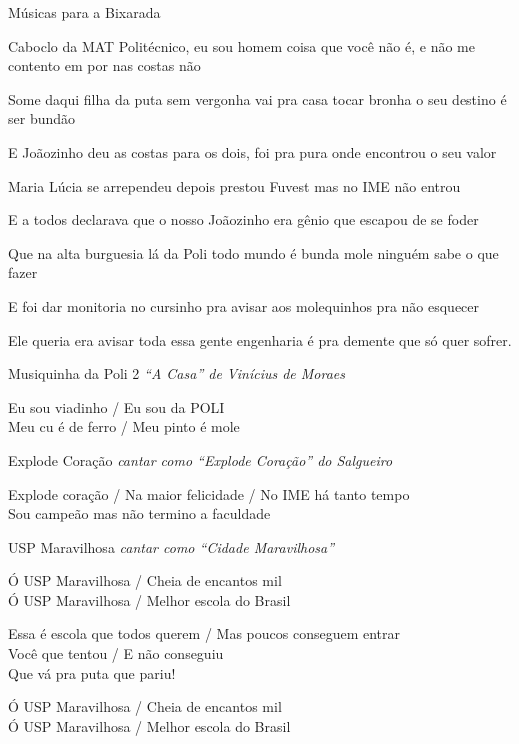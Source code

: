 \begin{secao}{Músicas para a Bixarada}
\begin{subsecao}{Caboclo da MAT}
Politécnico, eu sou homem coisa que você não é, e não me contento em por nas
costas não

Some daqui filha da puta sem vergonha vai pra casa tocar bronha o seu destino é
ser bundão

E Joãozinho deu as costas para os dois, foi pra pura onde encontrou o seu valor

Maria Lúcia se arrependeu depois prestou Fuvest mas no IME não entrou

E a todos declarava que o nosso Joãozinho era gênio que escapou de se foder

Que na alta burguesia lá da Poli todo mundo é bunda mole ninguém sabe o que
fazer

E foi dar monitoria no cursinho pra avisar aos molequinhos pra não esquecer

Ele queria era avisar toda essa gente engenharia é pra demente que só quer
sofrer.
\end{subsecao}

\begin{subsecao}{Musiquinha da Poli 2}
{\em ``A Casa'' de Vinícius de Moraes}

Eu sou viadinho / Eu sou da POLI \\
Meu cu é de ferro / Meu pinto é mole
\end{subsecao}

\begin{subsecao}{Explode Coração}
{\em cantar como ``Explode Coração'' do Salgueiro}

Explode coração / Na maior felicidade / No IME há tanto tempo \\
Sou campeão mas não termino a faculdade
\end{subsecao}

\begin{subsecao}{USP Maravilhosa}
{\em cantar como ``Cidade Maravilhosa''}

Ó USP Maravilhosa / Cheia de encantos mil \\
Ó USP Maravilhosa / Melhor escola do Brasil

Essa é escola que todos querem / Mas poucos conseguem entrar \\
Você que tentou / E não conseguiu \\
Que vá pra puta que pariu!

Ó USP Maravilhosa / Cheia de encantos mil \\
Ó USP Maravilhosa / Melhor escola do Brasil
\end{subsecao}


\end{secao}

